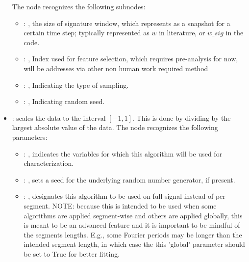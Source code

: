 \begin{itemize}
      The  node recognizes the following subnodes:
      \begin{itemize}
        \item {}: , 
          the size of signature window, which represents as a snapshot for a certain time step;
          typically represented as $w$ in literature, or $w\_sig$ in the code.

        \item {}: , 
          Index used for feature selection, which requires pre-analysis for now, will be addresses
          via other non human work required method

        \item {}: , 
          Indicating the type of sampling.

        \item {}: , 
          Indicating random seed.
      \end{itemize}

    \item {}:
      scales the data to the interval $[-1, 1]$. This is done by dividing by     the largest
      absolute value of the data.
      The  node recognizes the following parameters:
        \begin{itemize}
          \item {}: , 
            indicates the variables for which this algorithm will be used for characterization.
          \item {}: , 
            sets a seed for the underlying random number generator, if present.
          \item {}: , 
            designates this algorithm to be used on full signal instead of per
            segment. NOTE: because this is intended to be used when some algorithms are
            applied segment-wise and others are applied globally, this is meant to be an
            advanced feature and it is important to be mindful of the segments lengths.
            E.g., some Fourier periods may be longer than the intended segment length, in
            which case the this 'global' parameter should be set to True for better
            fitting. 
      \end{itemize}


\end{itemize}
